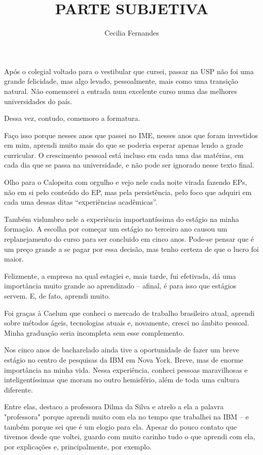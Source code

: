 \documentclass[titlepage,a4paper]{article}
\title{PARTE SUBJETIVA}
\author{Cecilia Fernandes}
\newcommand{\calopsita}{Calopsita}
\begin{document}
\maketitle

Após o colegial voltado para o vestibular que cursei, passar na USP não foi uma grande felicidade, mas algo levado, pessoalmente, mais como uma transição natural. Não comemorei a entrada num excelente curso numa das melhores universidades do país.

Dessa vez, contudo, comemoro a formatura.

Faço isso porque nesses anos que passei no IME, nesses anos que foram investidos em mim, aprendi muito mais do que se poderia esperar apenas lendo a grade curricular. O crescimento pessoal está incluso em cada uma das matérias, em cada dia que se passa na universidade, e não pode ser ignorado nesse texto final.

Olho para o \calopsita{} com orgulho e vejo nele cada noite virada fazendo EPs, não em si pelo conteúdo do EP, mas pela persistência, pelo foco que adquiri em cada uma dessas ditas ``experiências acadêmicas''.

Também vislumbro nele a experiência importantíssima do estágio na minha formação. A escolha por começar um estágio no terceiro ano causou um replanejamento do curso para ser concluido em cinco anos. Pode-se pensar que é um preço grande a se pagar por essa decisão, mas tenho certeza de que o lucro foi maior.

Felizmente, a empresa na qual estagiei e, mais tarde, fui efetivada, dá uma importância muito grande ao aprendizado -- afinal, é para isso que estágios servem. E, de fato, aprendi muito.

Foi graças à Caelum que conheci o mercado de trabalho brasileiro atual, aprendi sobre métodos ágeis, tecnologias atuais e, novamente, cresci no âmbito pessoal. Minha graduação seria incompleta sem esse complemento.

Nos cinco anos de bacharelado ainda tive a oportunidade de fazer um breve estágio no centro de pesquisas da IBM em Nova York. Breve, mas de enorme importância na minha vida. Nessa experiência, conheci pessoas maravilhosas e inteligentíssimas que moram no outro hemisfério, além de toda uma cultura diferente.

Entre elas, destaco a professora Dilma da Silva e atrelo a ela a palavra "professora" porque aprendi muito com ela no tempo que trabalhei na IBM -- e também porque sei que é um elogio para ela. Apesar do pouco contato que tivemos desde que voltei, guardo com muito carinho tudo o que aprendi com ela, por explicações e, principalmente, por exemplo.
\end{document}
